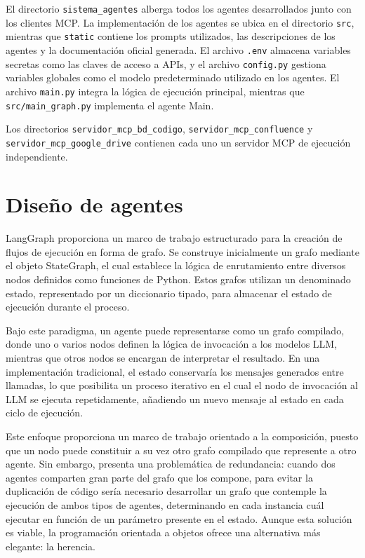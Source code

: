 El directorio \texttt{sistema\_agentes} alberga todos los agentes desarrollados junto con los clientes MCP. La implementación de los agentes se ubica en el directorio \texttt{src}, mientras que \texttt{static} contiene los prompts utilizados, las descripciones de los agentes y la documentación oficial generada. El archivo \texttt{.env} almacena variables secretas como las claves de acceso a APIs, y el archivo \texttt{config.py} gestiona variables globales como el modelo predeterminado utilizado en los agentes. El archivo \texttt{main.py} integra la lógica de ejecución principal, mientras que \texttt{src/main\_graph.py} implementa el agente Main.

Los directorios \texttt{servidor\_mcp\_bd\_codigo}, \texttt{servidor\_mcp\_confluence} y \texttt{servidor\_mcp\_google\_drive} contienen cada uno un servidor MCP de ejecución independiente. 
\section{Diseño de agentes}

LangGraph proporciona un marco de trabajo estructurado para la creación de flujos de ejecución en forma de grafo. Se construye inicialmente un grafo mediante el objeto StateGraph, el cual establece la lógica de enrutamiento entre diversos nodos definidos como funciones de Python. Estos grafos utilizan un denominado estado, representado por un diccionario tipado, para almacenar el estado de ejecución durante el proceso.

Bajo este paradigma, un agente puede representarse como un grafo compilado, donde uno o varios nodos definen la lógica de invocación a los modelos LLM, mientras que otros nodos se encargan de interpretar el resultado. En una implementación tradicional, el estado conservaría los mensajes generados entre llamadas, lo que posibilita un proceso iterativo en el cual el nodo de invocación al LLM se ejecuta repetidamente, añadiendo un nuevo mensaje al estado en cada ciclo de ejecución.

Este enfoque proporciona un marco de trabajo orientado a la composición, puesto que un nodo puede constituir a su vez otro grafo compilado que represente a otro agente. Sin embargo, presenta una problemática de redundancia: cuando dos agentes comparten gran parte del grafo que los compone, para evitar la duplicación de código sería necesario desarrollar un grafo que contemple la ejecución de ambos tipos de agentes, determinando en cada instancia cuál ejecutar en función de un parámetro presente en el estado. Aunque esta solución es viable, la programación orientada a objetos ofrece una alternativa más elegante: la herencia.

